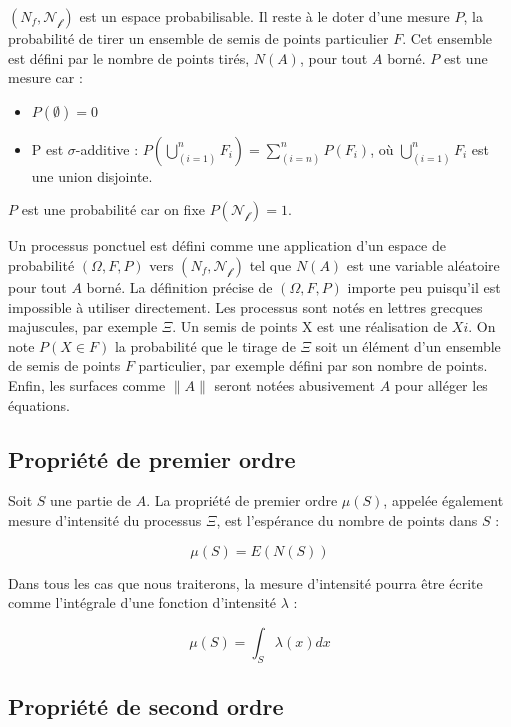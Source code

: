 \documentclass[
  11pt,
  french,
  A4paper,
  extrafontsizes,onecolumn,openright
  ]{memoir}
\theoremstyle{definition}
\theoremstyle{definition}
\theoremstyle{definition}
\theoremstyle{remark}
\begin{document}
\((N_f, \mathcal{N_f})\) est un espace probabilisable. Il reste à le
doter d'une mesure \(P\), la probabilité de tirer un ensemble de semis
de points particulier \(F\). Cet ensemble est défini par le nombre de
points tirés, \(N(A)\), pour tout \(A\) borné. \(P\) est une mesure car
:

\begin{itemize}
  \item $P(\emptyset)=0$
  \item P est $\sigma$-additive : $P(\bigcup_(i=1)^n F_i) = \sum_(i=n)^n {P(F_i)}$, où $\bigcup_(i=1)^n F_i$ est une union disjointe.
\end{itemize}

\(P\) est une probabilité car on fixe \(P(\mathcal{N_f})=1\).

Un processus ponctuel est défini comme une application d'un espace de
probabilité \((\Omega, F, P)\) vers \((N_f,\mathcal{N_f})\) tel que
\(N(A)\) est une variable aléatoire pour tout \(A\) borné. La définition
précise de \((\Omega, F, P)\) importe peu puisqu'il est impossible à
utiliser directement. Les processus sont notés en lettres grecques
majuscules, par exemple \(\Xi\). Un semis de points X est une
réalisation de \(Xi\). On note \(P(X \in F)\) la probabilité que le
tirage de \(\Xi\) soit un élément d'un ensemble de semis de points \(F\)
particulier, par exemple défini par son nombre de points. Enfin, les
surfaces comme \(\|A\|\) seront notées abusivement \(A\) pour alléger
les équations.

\subsection{Propriété de premier
ordre}\label{propriete-de-premier-ordre}

Soit \(S\) une partie de \(A\). La propriété de premier ordre
\(\mu(S)\), appelée également mesure d'intensité du processus \(\Xi\),
est l'espérance du nombre de points dans \(S\) :

\begin{equation}
  \mu(S)=E(N(S))
\end{equation}

Dans tous les cas que nous traiterons, la mesure d'intensité pourra être
écrite comme l'intégrale d'une fonction d'intensité \(\lambda\) :

\begin{equation}
  \mu(S)=\int_S \lambda(x)dx
\end{equation}

\subsection{Propriété de second ordre}\label{propriete-de-second-ordre}
\end{document}

